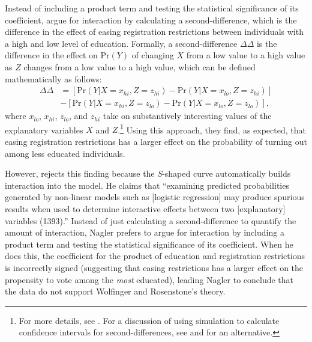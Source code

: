 \documentclass[12pt]{article}
\begin{document}
\noindent Instead of including a product term and testing the statistical significance of its coefficient, \cite{WolfingerRosenstone1980} argue for interaction by calculating a second-difference, which is the difference in the effect of easing registration restrictions between individuals with a high and low level of education. Formally, a second-difference $\Delta\Delta$ is the difference in the effect on $\text{Pr}(Y)$ of changing $X$ from a low value to a high value as $Z$ changes from a low value to a high value, which can be defined mathematically as follows:
\begin{align}
\Delta\Delta &= [\text{Pr}(Y | X = x_{hi}, Z = z_{hi}) - \text{Pr}(Y | X = x_{lo}, Z = z_{hi})]\nonumber \\
&-[\text{Pr}(Y  | X = x_{hi}, Z = z_{lo}) - \text{Pr}(Y  | X = x_{lo}, Z = z_{lo})], \nonumber
\end{align}
where $x_{lo}$, $x_{hi}$, $z_{lo}$, and $z_{hi}$ take on substantively interesting values of the explanatory variables $X$ and $Z$.\footnote{For more details, see \cite{BerryDeMerittEsarey2010}. For a discussion of using simulation to calculate confidence intervals for second-differences, see \cite{KingTomzWhittenburg2000} and \cite{HanmerKalkan2013} for an alternative.}  Using this approach, they find, as expected, that easing registration restrictions has a larger effect on the probability of turning out among less educated individuals. 

However, \citet[see \citeyear{Nagler1994} as well)]{Nagler1991} rejects this finding because the \textit{S}-shaped curve automatically builds interaction into the model. He claims that ``examining predicted probabilities generated by non-linear models such as [logistic regression] may produce spurious results when used to determine interactive effects between two [explanatory] variables (1393).'' Instead of just calculating a second-difference to quantify the amount of interaction, Nagler prefers to argue for interaction by including a product term and testing the statistical significance of its coefficient.  When he does this, the coefficient for the product of education and registration restrictions is incorrectly signed (suggesting that easing restrictions has a larger effect on the propensity to vote among the \textit{most} educated), leading Nagler to conclude that the data do not support Wolfinger and Rosenstone's theory. 
\end{document}
